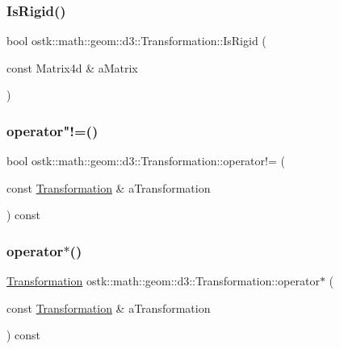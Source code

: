 \subsubsection{\texorpdfstring{Is\+Rigid()}{IsRigid()}}
{\footnotesize\ttfamily bool ostk\+::math\+::geom\+::d3\+::\+Transformation\+::\+Is\+Rigid (\begin{DoxyParamCaption}\item[{const Matrix4d \&}]{a\+Matrix }\end{DoxyParamCaption})\hspace{0.3cm}{\ttfamily [static]}}

\mbox{\label{classostk_1_1math_1_1geom_1_1d3_1_1_transformation_a4f10f8d34eb2351d366be604fb68777f}} 
\subsubsection{\texorpdfstring{operator"!=()}{operator!=()}}
{\footnotesize\ttfamily bool ostk\+::math\+::geom\+::d3\+::\+Transformation\+::operator!= (\begin{DoxyParamCaption}\item[{const \hyperlink{classostk_1_1math_1_1geom_1_1d3_1_1_transformation}{Transformation} \&}]{a\+Transformation }\end{DoxyParamCaption}) const}

\mbox{\label{classostk_1_1math_1_1geom_1_1d3_1_1_transformation_a11ce1ad2edeb56e2b1cd74deb78539b3}} 
\subsubsection{\texorpdfstring{operator$\ast$()}{operator*()}\hspace{0.1cm}{\footnotesize\ttfamily [1/2]}}
{\footnotesize\ttfamily \hyperlink{classostk_1_1math_1_1geom_1_1d3_1_1_transformation}{Transformation} ostk\+::math\+::geom\+::d3\+::\+Transformation\+::operator$\ast$ (\begin{DoxyParamCaption}\item[{const \hyperlink{classostk_1_1math_1_1geom_1_1d3_1_1_transformation}{Transformation} \&}]{a\+Transformation }\end{DoxyParamCaption}) const}

